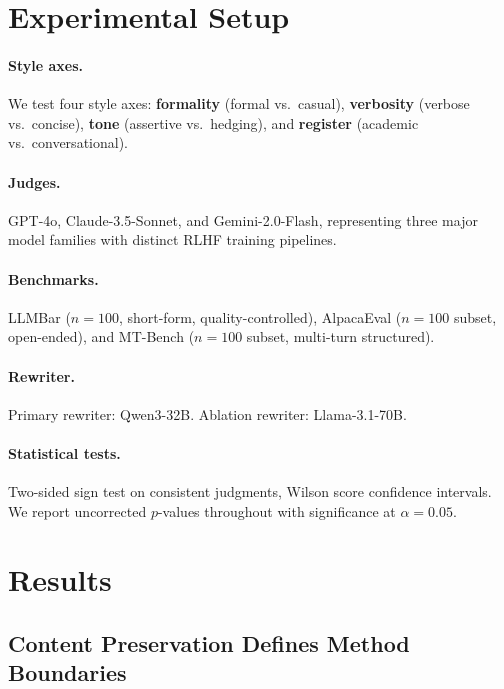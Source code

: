 \documentclass[11pt,a4paper]{article}
\begin{document}
\section{Experimental Setup}

\paragraph{Style axes.}
We test four style axes: \textbf{formality} (formal vs.\ casual), \textbf{verbosity} (verbose vs.\ concise), \textbf{tone} (assertive vs.\ hedging), and \textbf{register} (academic vs.\ conversational).

\paragraph{Judges.}
GPT-4o, Claude-3.5-Sonnet, and Gemini-2.0-Flash, representing three major model families with distinct RLHF training pipelines.

\paragraph{Benchmarks.}
LLMBar ($n=100$, short-form, quality-controlled), AlpacaEval ($n=100$ subset, open-ended), and MT-Bench ($n=100$ subset, multi-turn structured).

\paragraph{Rewriter.}
Primary rewriter: Qwen3-32B. Ablation rewriter: Llama-3.1-70B.

\paragraph{Statistical tests.}
Two-sided sign test on consistent judgments, Wilson score confidence intervals.
We report uncorrected $p$-values throughout with significance at $\alpha = 0.05$.

\section{Results}

\subsection{Content Preservation Defines Method Boundaries}
\label{sec:axis-feasibility}
\end{document}
